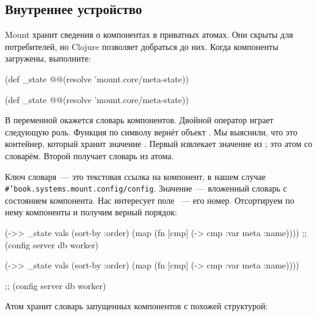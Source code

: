 \subsection{Внутреннее устройство}

Mount хранит сведения о компонентах в приватных атомах. Они скрыты для
потребителей, но Clojure позволяет добраться до них. Когда компоненты загружены,
выполните:

\ifnarrow

\begin{clojure}
(def _state
  @@(resolve 'mount.core/meta-state))
\end{clojure}

\else

\begin{clojure}
(def _state @@(resolve 'mount.core/meta-state))
\end{clojure}

\fi


В переменной  окажется словарь компонентов. Двойной оператор
 играет следующую роль. Функция  по символу вернёт
объект . Мы выяснили, что это контейнер, который хранит
значение . Первый  извлекает значение из
; это атом со словарём. Второй  получает словарь из атома.

Ключ словаря~--- это текстовая ссылка на компонент, в нашем случае
\texttt{\#'book.systems.mount\-.config/config}. Значение~--- вложенный словарь с
состоянием компонента. Нас интересует поле ~--- его
номер. Отсортируем по нему компоненты и получим верный порядок:

\ifafive

\begin{clojure}
(->> _state
     vals (sort-by :order)
     (map (fn [cmp]
            (-> cmp :var meta :name))))
;; (config server db worker)
\end{clojure}

\else

\begin{clojure}
(->> _state
     vals
     (sort-by :order)
     (map (fn [cmp]
            (-> cmp :var meta :name))))

;; (config server db worker)
\end{clojure}

\fi

Атом  хранит словарь запущенных компонентов с похожей структурой:

